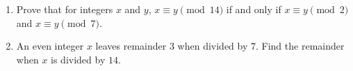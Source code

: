 \begin{enumerate}
\item[(a)] Prove that for integers $x$ and $y$, $x\equiv y\pmod{14}$ if and only if $x\equiv y\pmod2$ and $x\equiv y\pmod7$.
\item[(b)] An even integer $x$ leaves remainder $3$ when divided by $7$. Find the remainder when $x$ is divided by $14$.
\end{enumerate}
